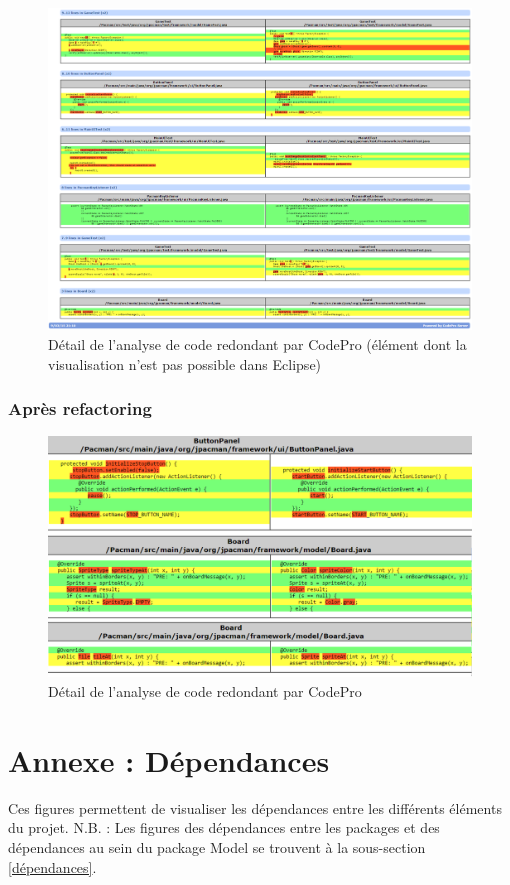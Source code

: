 \documentclass[12pt,a4paper,final]{article}
\begin{document}
\begin{figure}[ht]
	\centering
	\includegraphics[width=\textwidth]{images/SimilarCode_5.png}
	\caption{\label{SimilarCode5}Détail de l'analyse de code redondant par CodePro (élément dont la visualisation n'est pas possible dans Eclipse)}
\end{figure}

\subsubsection{Après refactoring}
\begin{figure}[ht]
	\centering
	\includegraphics[width=\textwidth]{images/SimilarCode_7.png}
	\caption{\label{SimilarCode7}Détail de l'analyse de code redondant par CodePro}
\end{figure}

\clearpage
\newpage
\section{Annexe : Dépendances}\label{Dependencies}
Ces figures permettent de visualiser les dépendances entre les différents éléments du projet.
N.B. : Les figures des dépendances entre les packages et des dépendances au sein du package Model se trouvent à la sous-section \ref{dépendances}.
\end{document}
